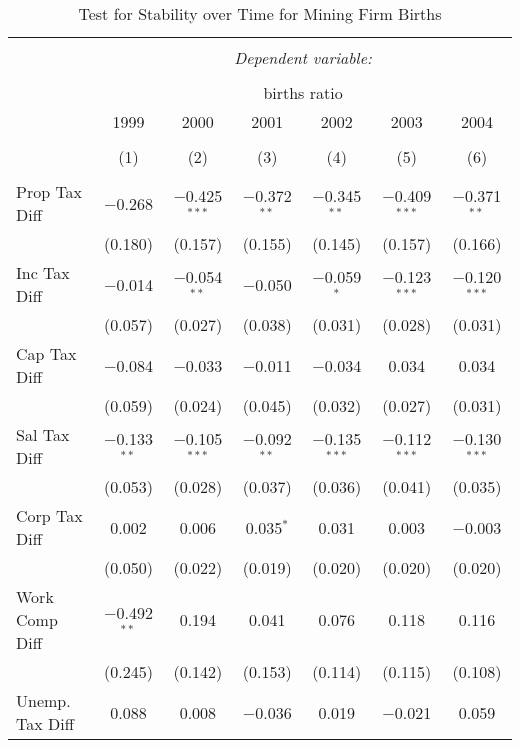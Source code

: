 
\begin{table}[!htbp] \centering 
  \caption{Test for Stability over Time for  Mining Firm Births} 
  \label{21year} 
\small 
\begin{tabular}{@{\extracolsep{5pt}}lcccccc} 
\\[-1.8ex]\hline 
\hline \\[-1.8ex] 
 & \multicolumn{6}{c}{\textit{Dependent variable:}} \\ 
\cline{2-7} 
\\[-1.8ex] & \multicolumn{6}{c}{births ratio} \\ 
 & 1999 & 2000 & 2001 & 2002 & 2003 & 2004 \\ 
\\[-1.8ex] & (1) & (2) & (3) & (4) & (5) & (6)\\ 
\hline \\[-1.8ex] 
 Prop Tax Diff & $-$0.268 & $-$0.425$^{***}$ & $-$0.372$^{**}$ & $-$0.345$^{**}$ & $-$0.409$^{***}$ & $-$0.371$^{**}$ \\ 
  & (0.180) & (0.157) & (0.155) & (0.145) & (0.157) & (0.166) \\ 
  Inc Tax Diff & $-$0.014 & $-$0.054$^{**}$ & $-$0.050 & $-$0.059$^{*}$ & $-$0.123$^{***}$ & $-$0.120$^{***}$ \\ 
  & (0.057) & (0.027) & (0.038) & (0.031) & (0.028) & (0.031) \\ 
  Cap Tax Diff & $-$0.084 & $-$0.033 & $-$0.011 & $-$0.034 & 0.034 & 0.034 \\ 
  & (0.059) & (0.024) & (0.045) & (0.032) & (0.027) & (0.031) \\ 
  Sal Tax Diff & $-$0.133$^{**}$ & $-$0.105$^{***}$ & $-$0.092$^{**}$ & $-$0.135$^{***}$ & $-$0.112$^{***}$ & $-$0.130$^{***}$ \\ 
  & (0.053) & (0.028) & (0.037) & (0.036) & (0.041) & (0.035) \\ 
  Corp Tax Diff & 0.002 & 0.006 & 0.035$^{*}$ & 0.031 & 0.003 & $-$0.003 \\ 
  & (0.050) & (0.022) & (0.019) & (0.020) & (0.020) & (0.020) \\ 
  Work Comp Diff & $-$0.492$^{**}$ & 0.194 & 0.041 & 0.076 & 0.118 & 0.116 \\ 
  & (0.245) & (0.142) & (0.153) & (0.114) & (0.115) & (0.108) \\ 
  Unemp. Tax Diff & 0.088 & 0.008 & $-$0.036 & 0.019 & $-$0.021 & 0.059 \\ 

\end{tabular}
\end{table}
